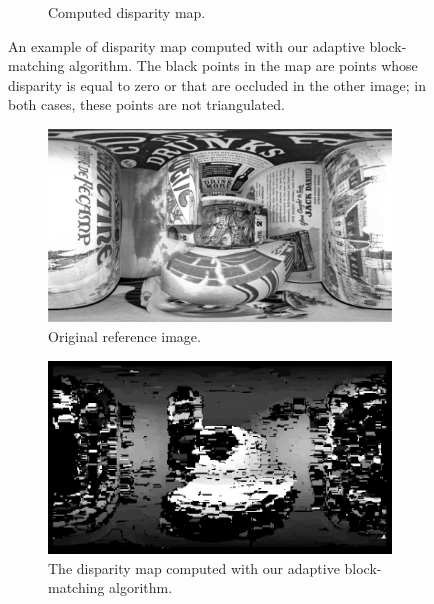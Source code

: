 \begin{figure}[h]
\begin{subfigure}{\linewidth}
		\caption{Computed disparity map.}
	\end{subfigure}
\caption{An example of disparity map computed with our adaptive block-matching
algorithm. The black points in the map are points whose disparity is equal to
zero or that are occluded in the other image; in both cases, these points are
not triangulated.}
\label{fig:llDisparity}
\end{figure}
%
\begin{figure}[h]
\centering
	\begin{subfigure}{0.7\linewidth}
		\centering
		\includegraphics[width=\linewidth]{img/original.png}
		\caption{Original reference image.}
	\end{subfigure}
	\begin{subfigure}{0.7\linewidth}
		\centering
		\includegraphics[width=\linewidth]{img/our_disparity.png}
		\caption{The disparity map computed with our adaptive block-matching
		algorithm.}
	\end{subfigure}
	\begin{subfigure}{0.7\linewidth}
		\centering

\end{subfigure}
\end{figure}

